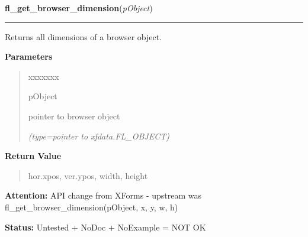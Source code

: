 \hspace{.8\funcindent}\begin{boxedminipage}{\funcwidth}

    \raggedright \textbf{fl\_get\_browser\_dimension}(\textit{pObject})

    \vspace{-1.5ex}

    \rule{\textwidth}{0.5\fboxrule}
\setlength{\parskip}{2ex}
    Returns all dimensions of a browser object.

\setlength{\parskip}{1ex}
      \textbf{Parameters}
      \vspace{-1ex}

      \begin{quote}
        \begin{Ventry}{xxxxxxx}

          \item[pObject]

          pointer to browser object

            {\it (type=pointer to xfdata.FL\_OBJECT)}

        \end{Ventry}

      \end{quote}

      \textbf{Return Value}
    \vspace{-1ex}

      \begin{quote}
      hor.xpos, ver.ypos, width, height

      \end{quote}

\textbf{Attention:} API change from XForms - upstream was fl\_get\_browser\_dimension(pObject, 
x, y, w, h)



\textbf{Status:} Untested + NoDoc + NoExample = NOT OK



    \end{boxedminipage}

    \label{xformslib:library:fl_set_browser_dblclick_callback}

    \vspace{0.5ex}

